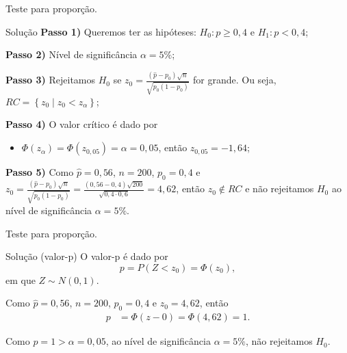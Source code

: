 \documentclass[8pt]{beamer}
\begin{document}
\begin{frame}{Teste para proporção.}

\large

\begin{block}{Solução}
	\textbf{Passo 1)} Queremos ter as hipóteses: $H_0: p \geq 0,4$ e $H_1: p < 0,4$;
	
	\textbf{Passo 2)} Nível de significância $\alpha = 5\%$;
	
	\textbf{Passo 3)} Rejeitamos $H_0$ se $z_0 = \frac{(\hat{p} - p_0)\sqrt{n}}{\sqrt{p_0(1-p_0)}}$ for grande. Ou seja, $RC=\left\{ z_0 \mid z_0 < z_\alpha \right\}$;
	
	\textbf{Passo 4)} O valor crítico é dado por
	\begin{itemize}
		\item $\Phi\left( z_\alpha \right) = \Phi\left( z_{0,05} \right) = \alpha = 0,05$, então $z_{0,05} = -1,64$;
	\end{itemize}

	\textbf{Passo 5)} Como $\hat{p} = 0,56$, $n=200$, $p_0=0,4$ e $z_0= \frac{(\hat{p} - p_0)\sqrt{n}}{\sqrt{p_0(1-p_0)}}=\frac{(0,56-0,4)\sqrt{200}}{\sqrt{0,4 \cdot 0,6}} = 4,62$, então $z_0 \not\in RC$ e não rejeitamos $H_0$ ao nível de significância $\alpha = 5\%$.
\end{block}

\normalsize
\end{frame}

\begin{frame}{Teste para proporção.}

\large
\begin{block}{Solução (valor-p)}
	O valor-p é dado por
	$$p=P\left(Z < z_0 \right) =  \Phi\left(z_0\right),$$
	em que $Z \sim N(0,1)$.
	\vfill
	
	Como $\hat{p}=0,56$, $n=200$, $p_0=0,4$ e $z_0=4,62$, então
	\begin{align*}
	p &= \Phi \left( z-0 \right) = \Phi \left( 4,62 \right) = 1.
	\end{align*}
	\vfill
	
	Como $p=1 > \alpha = 0,05$, ao nível de significância $\alpha=5\%$, não rejeitamos $H_0$.
\end{block}
\normalsize

\end{frame}
\end{document}
